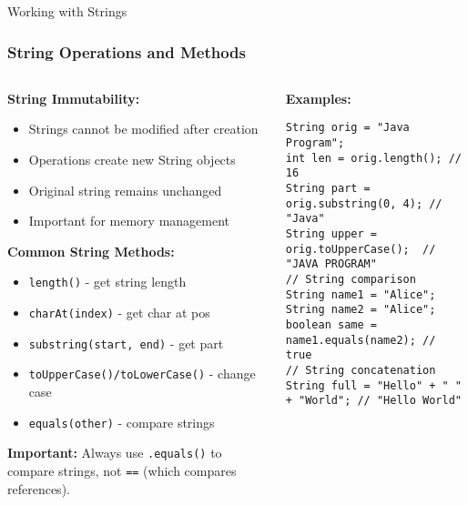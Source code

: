 \documentclass[aspectratio=169]{beamer}
\begin{document}
\begin{frame}[fragile]{Working with Strings}
    \frametitle{String Operations and Methods}
    
    \begin{columns}[t]
        \begin{column}{0.5\textwidth}
            \textbf{String Immutability:}
            \begin{itemize}
                \item Strings cannot be modified after creation
                \item Operations create new String objects
                \item Original string remains unchanged
                \item Important for memory management
            \end{itemize}
            
            \vspace{0.5em}
            
            \textbf{Common String Methods:}
            \begin{itemize}
                \item \scriptsize \texttt{length()} - get string length
                \item \scriptsize \texttt{charAt(index)} - get char at pos
                \item \scriptsize \texttt{substring(start, end)} - get part
                \item \scriptsize \texttt{toUpperCase()/toLowerCase()} - change case
                \item \scriptsize \texttt{equals(other)} - compare strings
            \end{itemize}
            \tiny \textbf{Important:} Always use \texttt{.equals()} to compare strings, not \texttt{==} (which compares references).
        \end{column}
        
        \begin{column}{0.5\textwidth}
            \textbf{Examples:}
            \begin{lstlisting}
String orig = "Java Program";
int len = orig.length(); // 16
String part = orig.substring(0, 4); // "Java"
String upper = orig.toUpperCase();  // "JAVA PROGRAM"
// String comparison
String name1 = "Alice";
String name2 = "Alice";
boolean same = name1.equals(name2); // true
// String concatenation
String full = "Hello" + " " + "World"; // "Hello World"
            \end{lstlisting}
        \end{column}
    \end{columns}
    
    \vspace{0.3em}
    
\end{frame}
\end{document}
